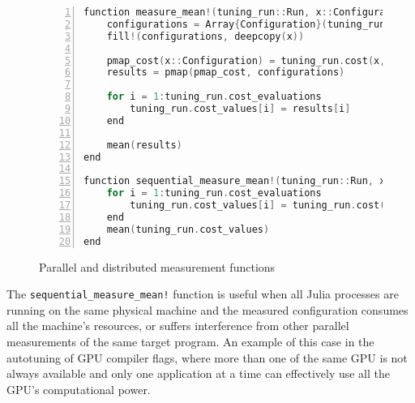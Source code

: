 \begin{figure}[htpb]
    \begin{minipage}{\linewidth}
    \begin{lstlisting}[language=C, basicstyle=\ttfamily\scriptsize,
        numbers=left,
        frame=no, showspaces=false, showstringspaces=false,
        numberstyle=\scriptsize,
        xleftmargin=1.5cm,
        keywords={%
            @spawnat, remotecall, Nullable, Any,
            @fetch, Future, Array, Float64, julia,
            while, true, function, end, put!,
            take!, sleep, RemoteChannel, Channel,
            Int, Tuple, const, addprocs, @schedule,
            @everywhere, for, in, myid, @async,
            remote_do, workers, Result, Real,
            AbstractFloat, deepcopy, rand, exp, true,
            Function, false, Run, Array, Configuration,
            pmap, mean, return%
        },
        otherkeywords={::, \&, \*, +, -, /, [, ], >, <, put!, take!, neighbor!,
                       update!}
    ]
function measure_mean!(tuning_run::Run, x::Configuration)
    configurations = Array{Configuration}(tuning_run.cost_evaluations)
    fill!(configurations, deepcopy(x))

    pmap_cost(x::Configuration) = tuning_run.cost(x, tuning_run.cost_arguments)
    results = pmap(pmap_cost, configurations)

    for i = 1:tuning_run.cost_evaluations
        tuning_run.cost_values[i] = results[i]
    end

    mean(results)
end

function sequential_measure_mean!(tuning_run::Run, x::Configuration)
    for i = 1:tuning_run.cost_evaluations
        tuning_run.cost_values[i] = tuning_run.cost(x, tuning_run.cost_arguments)
    end
    mean(tuning_run.cost_values)
end
    \end{lstlisting}
    \end{minipage}
    \caption{Parallel and distributed measurement functions}
    \label{fig:nodal-measurement}
\end{figure}

The \texttt{sequential\_measure\_mean!} function is useful when all Julia
processes are running on the same physical machine and the measured
configuration consumes all the machine's resources, or suffers
interference from other parallel measurements of the same target program. An
example of this case in the autotuning of GPU compiler flags, where more than
one of the same GPU is not always available and only one application at a time
can effectively use all the GPU's computational power.

